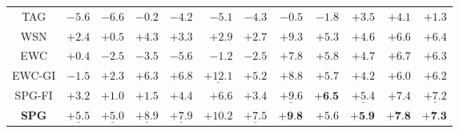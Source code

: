 \begin{table}[t]
{\begin{tabular}{crrrrrrrrrrr}
TAG &
$-5.6$ & $-6.6$ &
$-0.2$ & $-4.2$ &
$-5.1$ &
$-4.3$ &
$-0.5$ & $-1.8$ &
$+3.5$ & $+4.1$ &
$+1.3$ \\


WSN & 
$+2.4$ & $+0.5$ &
$+4.3$ & $+3.3$ &
$+2.9$ & 
$+2.7$ & 
$+9.3$ & $+5.3$ &
$+4.6$ & $+6.6$ &
$+6.4$ \\

EWC &
$+0.4$ & $-2.5$ & 
$-3.5$ & $-5.6$ &
$-1.2$ &
$-2.5$ &
$+7.8$ & $+5.8$ &
$+4.7$ & $+6.7$ &
$+6.3$ \\


\hdashline


EWC-GI &
$-1.5$ & $+2.3$ &
$+6.3$ & $+6.8$ &
$\underline{+12.1}$ &
$+5.2$ &
$+8.8$ & $+5.7$ &
$+4.2$ & $+6.0$ &
$+6.2$ \\


SPG-FI &
$+3.2$ & $+1.0$ & 
$+1.5$ & $+4.4$ & 
$+6.6$ & 
$+3.4$ &
$\underline{+9.6}$ & $\textbf{+6.5}$ & 
$\underline{+5.4}$ & $+7.4$ & 
$\underline{+7.2}$ \\


\midrule


\textbf{SPG} &
$\underline{+5.5}$ & $\underline{+5.0}$ & 
$\underline{+8.9}$ & $\underline{+7.9}$ & 
$+10.2$ & 
$\underline{+7.5}$ &
$\textbf{+9.8}$ & $+5.6$ & 
$\textbf{+5.9}$ & $\textbf{+7.8}$ & 
$\textbf{+7.3}$ \\

\bottomrule
\end{tabular}
}
\vspace{-5mm}
\end{table}





